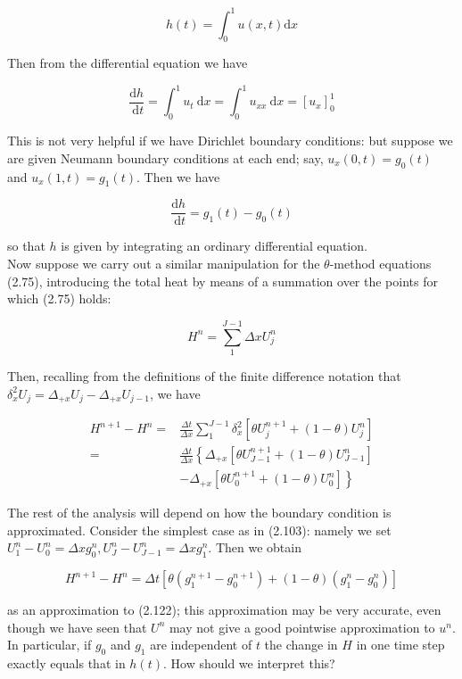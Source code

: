 \documentclass[10pt]{article}
\begin{document}
\[
h(t)=\int_{0}^{1} u(x, t) \mathrm{d} x
\]

Then from the differential equation we have

\[
\frac{\mathrm{d} h}{\mathrm{~d} t}=\int_{0}^{1} u_{t} \mathrm{~d} x=\int_{0}^{1} u_{x x} \mathrm{~d} x=\left[u_{x}\right]_{0}^{1}
\]

This is not very helpful if we have Dirichlet boundary conditions: but suppose we are given Neumann boundary conditions at each end; say, \(u_{x}(0, t)=g_{0}(t)\) and \(u_{x}(1, t)=g_{1}(t)\). Then we have

\[
\frac{\mathrm{d} h}{\mathrm{~d} t}=g_{1}(t)-g_{0}(t)
\]

so that \(h\) is given by integrating an ordinary differential equation.\\
Now suppose we carry out a similar manipulation for the \(\theta\)-method equations (2.75), introducing the total heat by means of a summation over the points for which (2.75) holds:

\[
H^{n}=\sum_{1}^{J-1} \Delta x U_{j}^{n}
\]

Then, recalling from the definitions of the finite difference notation that \(\delta_{x}^{2} U_{j}=\Delta_{+x} U_{j}-\Delta_{+x} U_{j-1}\), we have

\[
\begin{aligned}
H^{n+1}-H^{n}= & \frac{\Delta t}{\Delta x} \sum_{1}^{J-1} \delta_{x}^{2}\left[\theta U_{j}^{n+1}+(1-\theta) U_{j}^{n}\right] \\
= & \frac{\Delta t}{\Delta x}\left\{\Delta_{+x}\left[\theta U_{J-1}^{n+1}+(1-\theta) U_{J-1}^{n}\right]\right. \\
& \left.-\Delta_{+x}\left[\theta U_{0}^{n+1}+(1-\theta) U_{0}^{n}\right]\right\}
\end{aligned}
\]

The rest of the analysis will depend on how the boundary condition is approximated. Consider the simplest case as in (2.103): namely we set \(U_{1}^{n}-U_{0}^{n}=\Delta x g_{0}^{n}, U_{J}^{n}-U_{J-1}^{n}=\Delta x g_{1}^{n}\). Then we obtain

\[
H^{n+1}-H^{n}=\Delta t\left[\theta\left(g_{1}^{n+1}-g_{0}^{n+1}\right)+(1-\theta)\left(g_{1}^{n}-g_{0}^{n}\right)\right]
\]

as an approximation to (2.122); this approximation may be very accurate, even though we have seen that \(U^{n}\) may not give a good pointwise approximation to \(u^{n}\). In particular, if \(g_{0}\) and \(g_{1}\) are independent of \(t\) the change in \(H\) in one time step exactly equals that in \(h(t)\). How should we interpret this?
\end{document}

